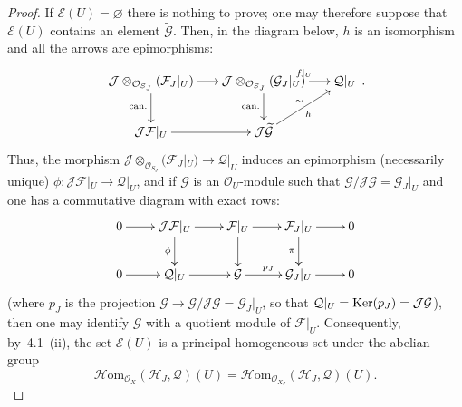 \begin{proof}
If \(\mathcal{E}(U)=\varnothing\) there is nothing to prove; one may
therefore suppose that \(\mathcal{E}(U)\) contains an element
\(\widetilde{\mathcal{G}}\). Then, in the diagram below, \(h\) is an
isomorphism and all the arrows are epimorphisms:
\[
\xymatrix@C=1.6em@R=2.2em{
\mathcal{J}\otimes_{\mathcal{O}_{S_{J}}}(\mathcal{F}_{J}|_{U})
  \ar[r] \ar[d]_{\mathrm{can.}}
& \mathcal{J}\otimes_{\mathcal{O}_{S_{J}}}(\mathcal{G}_{J}|_{U})
  \ar[r]^{f|_{U}} \ar[d]_{\mathrm{can.}}
& \mathcal{Q}|_{U} \\
\mathcal{J}\mathcal{F}|_{U} \ar[r]
& \mathcal{J}\widetilde{\mathcal{G}} \ar[ur]_{h}^{\sim}
&
}\,.
\]
Thus, the morphism
\(\mathcal{J}\otimes_{\mathcal{O}_{S_{J}}}(\mathcal{F}_{J}|_{U})
  \to\mathcal{Q}|_{U}\)
induces an epimorphism (necessarily unique)
\(\phi\colon\mathcal{J}\mathcal{F}|_{U}\to\mathcal{Q}|_{U}\), and if
\(\mathcal{G}\) is an \(\mathcal{O}_{U}\)-module such that
\(\mathcal{G}/\mathcal{J}\mathcal{G}=\mathcal{G}_{J}|_{U}\) and one has a
commutative diagram with exact rows:
\[
\xymatrix@C=2.2em@R=2.2em{
0 \ar[r]
  & \mathcal{J}\mathcal{F}|_{U} \ar[r] \ar[d]_{\phi}
  & \mathcal{F}|_{U} \ar[r] \ar[d]
  & \mathcal{F}_{J}|_{U} \ar[r] \ar[d]_{\pi}
  & 0 \\
0 \ar[r]
  & \mathcal{Q}|_{U} \ar[r]
  & \mathcal{G} \ar[r]^{p_{J}}
  & \mathcal{G}_{J}|_{U} \ar[r]
  & 0
}
\]
(where \(p_{J}\) is the projection
\(\mathcal{G}\to\mathcal{G}/\mathcal{J}\mathcal{G}=\mathcal{G}_{J}|_{U}\),
so that \(\mathcal{Q}|_{U}=\operatorname{Ker}(p_{J})=\mathcal{J}\mathcal{G}\)), then one
may identify \(\mathcal{G}\) with a quotient module of
\(\mathcal{F}|_{U}\). Consequently, by~4.1~(ii), the set
\(\mathcal{E}(U)\) is a principal homogeneous set under the abelian group
\[
\mathcal{H}\mathrm{om}_{\mathcal{O}_{X}}(\mathcal{H}_{J},\mathcal{Q})(U)
  =\mathcal{H}\mathrm{om}_{\mathcal{O}_{X_{J}}}(\mathcal{H}_{J},\mathcal{Q})(U).
\]
\end{proof}

